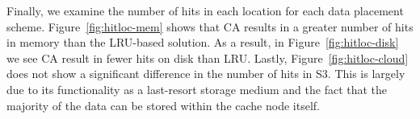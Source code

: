 Finally, we examine the number of hits in each location for each data placement
scheme. Figure~\ref{fig:hitloc-mem} shows that CA results in a greater number
of hits in memory than the LRU-based solution. As a result, in
Figure~\ref{fig:hitloc-disk} we see CA result in fewer hits on disk than LRU\@.
Lastly, Figure~\ref{fig:hitloc-cloud} does not show a significant difference in
the number of hits in S3. This is largely due to its functionality as a
last-resort storage medium and the fact that the majority of the data can be
stored within the cache node itself.


